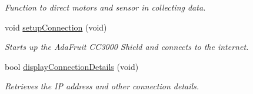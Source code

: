 \begin{DoxyCompactItemize}
\begin{DoxyCompactList}\small\item\em Function to direct motors and sensor in collecting data. \end{DoxyCompactList}\item 
void \hyperlink{compressed_sensing_8ino_a0fc912d7e8ff4b0908303847912e0da1}{setup\+Connection} (void)
\begin{DoxyCompactList}\small\item\em Starts up the Ada\+Fruit C\+C3000 Shield and connects to the internet. \end{DoxyCompactList}\item 
bool \hyperlink{compressed_sensing_8ino_a9b1d041a41e4d1a390370c7096171bf8}{display\+Connection\+Details} (void)
\begin{DoxyCompactList}\small\item\em Retrieves the I\+P address and other connection details. \end{DoxyCompactList}\end{DoxyCompactItemize}
